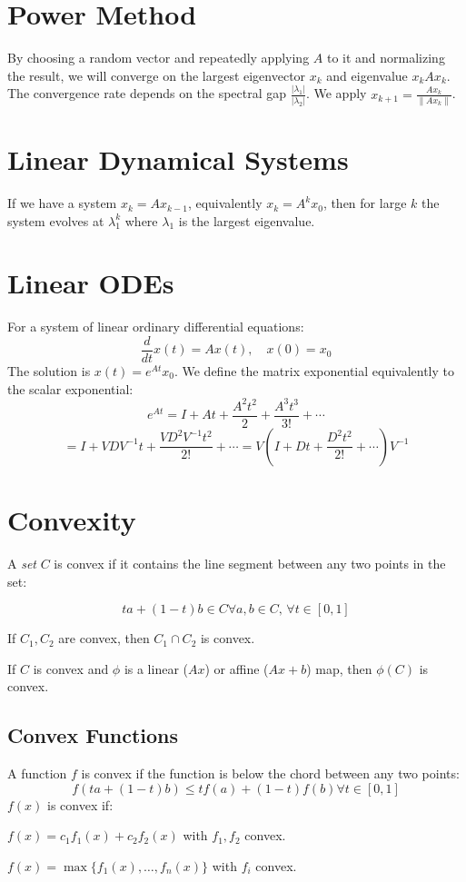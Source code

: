 \documentclass[10pt]{extarticle}
\begin{document}
\begin{multicols*}{2}
\section{Power Method}
By choosing a random vector and repeatedly applying $A$ to it and normalizing the result, we will converge on the largest eigenvector $x_k$ and eigenvalue $x_k A x_k$. The convergence rate depends on the spectral gap $\tfrac{|\lambda_1|}{|\lambda_2|}$. We apply $x_{k+1} = \frac{Ax_k}{\|Ax_k\|}$.

\section{Linear Dynamical Systems}
If we have a system $x_k = Ax_{k-1}$, equivalently $x_k = A^k x_0$, then for large $k$ the system evolves at $\lambda_1^k$ where $\lambda_1$ is the largest eigenvalue.

\section{Linear ODEs}
For a system of linear ordinary differential equations:
\[ \frac{d}{dt} x(t) = Ax(t), \quad x(0) = x_0 \]
The solution is $x(t) = e^{At}x_0$. We define the matrix exponential equivalently to the scalar exponential:
\[ e^{At} = I + At + \frac{A^2 t^2}{2} + \frac{A^3 t^3}{3!} + \cdots \]
\[ = I + VDV^{-1}t + \frac{VD^2V^{-1} t^2}{2!} + \cdots = V(I + Dt + \frac{D^2t^2}{2!} + \cdots)V^{-1} \]

\section{Convexity}
A \emph{set} $C$ is convex if it contains the line segment between any two points in the set:

\[ ta + (1-t)b \in C \forall a, b \in C,\, \forall t \in [0, 1] \]

\begin{compactitem}
	\item If $C_1, C_2$ are convex, then $C_1 \cap C_2$ is convex.
	\item If $C$ is convex and $\phi$ is a linear ($Ax$) or affine ($Ax + b$) map, then $\phi(C)$ is convex.
\end{compactitem}

\subsection{Convex Functions}
A function $f$ is convex if the function is below the chord between any two points:
\[ f(ta + (1-t)b) \leq t f(a) + (1-t) f(b) \forall t \in [0, 1] \]
$f(x)$ is convex if:
\begin{compactitem}
\item $f(x) = c_1 f_1(x) + c_2 f_2(x)$ with $f_1, f_2$ convex.
\item $f(x) = \max \{f_1(x), \ldots, f_n(x)\}$ with $f_i$ convex.
\end{compactitem}


\end{multicols*}
\end{document}
